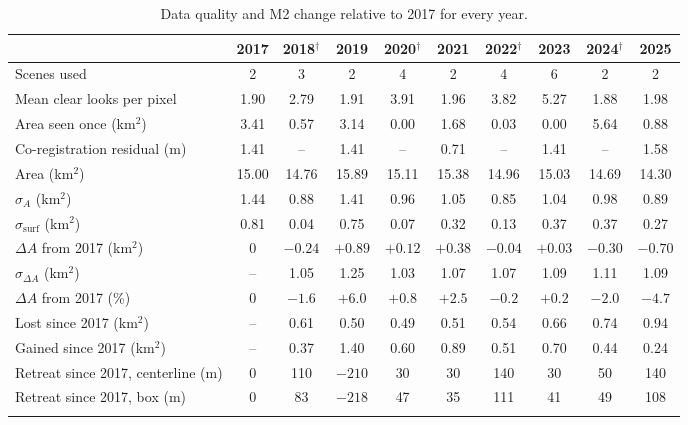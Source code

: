 \documentclass[pdflatex,sn-mathphys-num]{sn-jnl}%
\theoremstyle{thmstyleone}%
\theoremstyle{thmstyletwo}%
\theoremstyle{thmstylethree}%
\newcommand{\kmsq}{km$^2$}
\begin{document}
\begin{appendices}
\begin{table}
\caption{Data quality and M2 change relative to 2017 for every year.}\label{tab:a1}
\begin{tabular*}{\textheight}{@{\extracolsep\fill}lccccccccc}
\toprule
 & 2017 & 2018$^\dagger$ & 2019 & 2020$^\dagger$ & 2021 & 2022$^\dagger$ & 2023 & 2024$^\dagger$ & 2025 \\
\midrule
Scenes used & 2 & 3 & 2 & 4 & 2 & 4 & 6 & 2 & 2 \\
Mean clear looks per pixel & 1.90 & 2.79 & 1.91 & 3.91 & 1.96 & 3.82 & 5.27 & 1.88 & 1.98 \\
Area seen once (\kmsq) & 3.41 & 0.57 & 3.14 & 0.00 & 1.68 & 0.03 & 0.00 & 5.64 & 0.88 \\
Co-registration residual (m) & 1.41 & -- & 1.41 & -- & 0.71 & -- & 1.41 & -- & 1.58 \\
\midrule
Area (\kmsq) & 15.00 & 14.76 & 15.89 & 15.11 & 15.38 & 14.96 & 15.03 & 14.69 & 14.30 \\
$\sigma_A$ (\kmsq) & 1.44 & 0.88 & 1.41 & 0.96 & 1.05 & 0.85 & 1.04 & 0.98 & 0.89 \\
$\sigma_\mathrm{surf}$ (\kmsq) & 0.81 & 0.04 & 0.75 & 0.07 & 0.32 & 0.13 & 0.37 & 0.37 & 0.27 \\
$\Delta A$ from 2017 (\kmsq) & 0 & $-0.24$ & $+0.89$ & $+0.12$ & $+0.38$ & $-0.04$ & $+0.03$ & $-0.30$ & $-0.70$ \\
$\sigma_{\Delta A}$ (\kmsq) & -- & 1.05 & 1.25 & 1.03 & 1.07 & 1.07 & 1.09 & 1.11 & 1.09 \\
$\Delta A$ from 2017 (\%) & 0 & $-1.6$ & $+6.0$ & $+0.8$ & $+2.5$ & $-0.2$ & $+0.2$ & $-2.0$ & $-4.7$ \\
Lost since 2017 (\kmsq) & -- & 0.61 & 0.50 & 0.49 & 0.51 & 0.54 & 0.66 & 0.74 & 0.94 \\
Gained since 2017 (\kmsq) & -- & 0.37 & 1.40 & 0.60 & 0.89 & 0.51 & 0.70 & 0.44 & 0.24 \\
Retreat since 2017, centerline (m) & 0 & 110 & $-210$ & 30 & 30 & 140 & 30 & 50 & 140 \\
Retreat since 2017, box (m) & 0 & 83 & $-218$ & 47 & 35 & 111 & 41 & 49 & 108 \\
\botrule
\end{tabular*}
\end{table}


\end{appendices}
\end{document}
